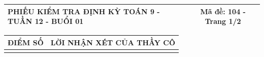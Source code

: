 \documentclass[12pt,a4paper]{article}
\begin{document}
\newpage
\noindent
\begin{tabularx}{\linewidth}{|X|c|}
\hline
\textbf{PHIẾU KIỂM TRA ĐỊNH KỲ TOÁN 9 - TUẦN 12 - BUỔI 01} & \textbf{Mã đề: 104 - Trang 1/2} \\
\hline
\end{tabularx}

\vspace{1.0mm}

\noindent
\begin{tabularx}{\linewidth}{|p{3.2cm}|X|}
\hline
\centering\textbf{ĐIỂM SỐ} & \centering\textbf{LỜI NHẬN XÉT CỦA THẦY CÔ} \tabularnewline
\hline
\rule{0pt}{1.8cm} & \tabularnewline
\hline
\end{tabularx}
\end{document}
